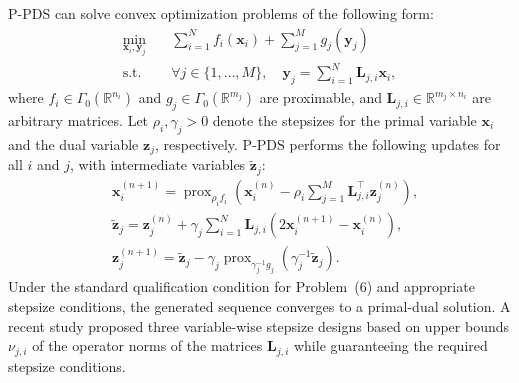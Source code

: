 P-PDS \cite{pock2011diagonal} can solve convex optimization problems of the following form:
\begin{equation}
\begin{aligned}
\min_{\mathbf{x}_i,\mathbf{y}_j}\quad & \sum_{i=1}^{N} f_i(\mathbf{x}_i) + \sum_{j=1}^{M} g_j(\mathbf{y}_j)\\
\mathrm{s.t.}\quad & \forall j\in\{1,\ldots,M\},\quad \mathbf{y}_j = \sum_{i=1}^{N} \mathbf{L}_{j,i}\mathbf{x}_i,
\end{aligned}
\label{eq:p_pds_general_form}
\end{equation}
where $f_i \in \Gamma_0(\mathbb{R}^{n_i})$ and $g_j \in \Gamma_0(\mathbb{R}^{m_j})$ are proximable, and $\mathbf{L}_{j,i} \in \mathbb{R}^{m_j\times n_i}$ are arbitrary matrices.
Let $\rho_i,\gamma_j>0$ denote the stepsizes for the primal variable $\mathbf{x}_i$ and the dual variable $\mathbf{z}_j$, respectively.
P-PDS performs the following updates for all $i$ and $j$, with intermediate variables $\widetilde{\mathbf{z}}_j$:
\begin{equation}
\begin{aligned}
&\mathbf{x}_i^{(n+1)} = \operatorname{prox}_{\rho_i f_i}\left(\mathbf{x}_i^{(n)} - \rho_i \sum_{j=1}^{M}\mathbf{L}_{j,i}^{\top}\mathbf{z}_j^{(n)}\right),\\
&\tilde{\mathbf{z}}_j = \mathbf{z}_j^{(n)} + \gamma_j \sum_{i=1}^{N}\mathbf{L}_{j,i}\left(2\mathbf{x}_i^{(n+1)} - \mathbf{x}_i^{(n)}\right),\\
&\mathbf{z}_j^{(n+1)} = \tilde{\mathbf{z}}_j - \gamma_j\operatorname{prox}_{\gamma_j^{-1}g_j}\left(\gamma_j^{-1}\tilde{\mathbf{z}}_j\right).
\end{aligned}
\end{equation}
Under the standard qualification condition for Problem~(6) and appropriate stepsize conditions, the generated sequence converges to a primal-dual solution.
A recent study \cite{NaganumaOno2023} proposed three variable-wise stepsize designs based on upper bounds $\nu_{j,i}$ of the operator norms of the matrices $\mathbf{L}_{j,i}$ while guaranteeing the required stepsize conditions.